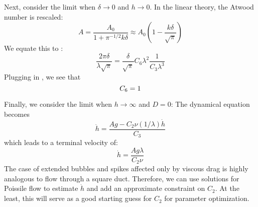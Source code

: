 Next, consider the limit when $\delta \rightarrow 0 $ and $h \rightarrow 0$.
In the linear theory, the Atwood number is rescaled:
\begin{equation}
A = \frac{A_0}{1 + \pi^{-1/2} k \delta} \approx A_0 \left(1 - \frac{k \delta}{\sqrt{\pi}}\right)
\end{equation}
We equate this to :
\begin{equation}
\frac{2 \pi \delta}{\lambda \sqrt{\pi}} = \frac{\delta}{\sqrt{\pi}} C_6 \lambda^2 \frac{1}{C_3 \lambda^3}
\end{equation}
Plugging in , we see that
\begin{equation} \elabel{c6}
C_6 = 1
\end{equation}

Finally, we consider the limit when $h \rightarrow \infty$ and $D = 0$:
The dynamical equation becomes
\begin{equation}
\ddot{h} = \frac{A g - C_2 \nu (1/\lambda) \dot{h}}{C_3}
\end{equation}
which leads to a terminal velocity of:
\begin{equation}
\dot{h} = \frac{A g \lambda}{C_2 \nu}
\end{equation}
The case of extended bubbles and spikes affected only by viscous drag is highly analogous to flow through a square duct.
Therefore, we can use solutions for Poissile flow to estimate $\dot{h}$ and add an approximate constraint on $C_2$.
At the least, this will serve as a good starting guess for $C_2$ for parameter optimization.

\begin{comment}
Next, consider the limit where $D = 0$ and $h \rightarrow 0$.
The dynamical equation becomes:
\begin{equation}
\ddot{h} = \left[\frac{C_0 A g }{C_3 \lambda} - C_2 \nu \dot{h}/\lambda \right] h
\end{equation}
In the spirit of the linear growth model, assume the interface grows as $h(t) = a_0 \cosh[\gamma t] $, with
\begin{equation}
\gamma = \frac{C_0 A g }{C_3 \lambda} - C_2 \nu \dot{h}/\lambda 
\end{equation}
The velocity is given by $\dot{h} = a_0 \gamma \sinh[\gamma t] = \gamma \tanh[\gamma t] h$, yielding:
\begin{equation}
\gamma = \frac{C_0 A g }{C_3 \lambda} - \gamma C_2 \tanh[\gamma t] h \nu /\lambda 
\end{equation}
\end{comment}
